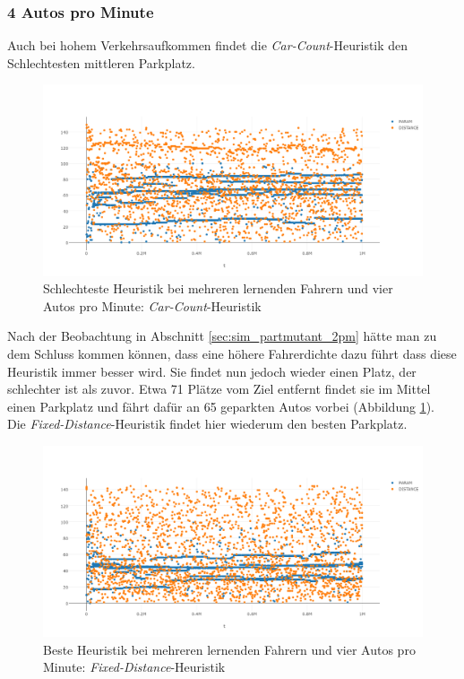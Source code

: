 \subsubsection{4 Autos pro Minute}

Auch bei hohem Verkehrsaufkommen findet die \emph{Car-Count}-Heuristik den Schlechtesten mittleren Parkplatz. \\
\begin{figure}
	\includegraphics[width=\textwidth]{analyse/SomeMutants/4pm/car4some.png}
	\caption{Schlechteste Heuristik bei mehreren lernenden Fahrern und vier Autos pro Minute: \emph{Car-Count}-Heuristik}\label{fig:res_pm_4pm_worst}
\end{figure}
Nach der Beobachtung in Abschnitt \ref{sec:sim_partmutant_2pm} hätte man zu dem Schluss kommen können, dass eine höhere Fahrerdichte dazu führt dass diese Heuristik immer besser wird. Sie findet nun jedoch wieder einen Platz, der schlechter ist als zuvor. Etwa 71 Plätze vom Ziel entfernt findet sie im Mittel einen Parkplatz und fährt dafür an 65 geparkten Autos vorbei (Abbildung \ref{fig:res_pm_4pm_worst}).\\
Die \emph{Fixed-Distance}-Heuristik findet hier wiederum den besten Parkplatz. 
\begin{figure}
	\includegraphics[width=\textwidth]{analyse/SomeMutants/4pm/fixed4some.png}
	\caption{Beste Heuristik bei mehreren lernenden Fahrern und vier Autos pro Minute: \emph{Fixed-Distance}-Heuristik}\label{fig:res_pm_4pm_best}
\end{figure}
